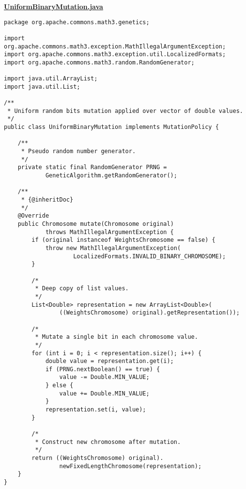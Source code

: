 \textbf{\underline{UniformBinaryMutation.java}}
\begin{verbatim}
package org.apache.commons.math3.genetics;

import org.apache.commons.math3.exception.MathIllegalArgumentException;
import org.apache.commons.math3.exception.util.LocalizedFormats;
import org.apache.commons.math3.random.RandomGenerator;

import java.util.ArrayList;
import java.util.List;

/**
 * Uniform random bits mutation applied over vector of double values.
 */
public class UniformBinaryMutation implements MutationPolicy {

    /**
     * Pseudo random number generator.
     */
    private static final RandomGenerator PRNG =
            GeneticAlgorithm.getRandomGenerator();

    /**
     * {@inheritDoc}
     */
    @Override
    public Chromosome mutate(Chromosome original)
            throws MathIllegalArgumentException {
        if (original instanceof WeightsChromosome == false) {
            throw new MathIllegalArgumentException(
                    LocalizedFormats.INVALID_BINARY_CHROMOSOME);
        }

        /*
         * Deep copy of list values.
         */
        List<Double> representation = new ArrayList<Double>(
                ((WeightsChromosome) original).getRepresentation());

        /*
         * Mutate a single bit in each chromosome value.
         */
        for (int i = 0; i < representation.size(); i++) {
            double value = representation.get(i);
            if (PRNG.nextBoolean() == true) {
                value -= Double.MIN_VALUE;
            } else {
                value += Double.MIN_VALUE;
            }
            representation.set(i, value);
        }

        /*
         * Construct new chromosome after mutation.
         */
        return ((WeightsChromosome) original).
                newFixedLengthChromosome(representation);
    }
}
\end{verbatim}

